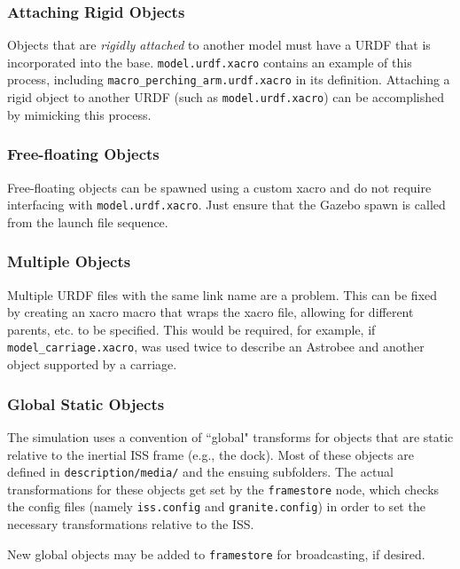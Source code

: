 \documentclass{article}
\begin{document}
\subsubsection{Attaching Rigid Objects}

Objects that are \textit{rigidly attached} to another model must have a URDF that is incorporated into the base. \texttt{model.urdf.xacro} contains an example of this process, including \texttt{macro\_perching\_arm.urdf.xacro} in its definition. Attaching a rigid object to another URDF (such as \texttt{model.urdf.xacro}) can be accomplished by mimicking this process.

\subsubsection{Free-floating Objects}

Free-floating objects can be spawned using a custom xacro and do not require interfacing with \texttt{model.urdf.xacro}. Just ensure that the Gazebo spawn is called from the launch file sequence.

\subsubsection{Multiple Objects}

Multiple URDF files with the same link name are a problem. This can be fixed by creating an xacro macro that wraps the xacro file, allowing for different parents, etc. to be specified. This would be required, for example, if \texttt{model\_carriage.xacro}, was used twice to describe an Astrobee and another object supported by a carriage.

\subsubsection{Global Static Objects}

The simulation uses a convention of ``global" transforms for objects that are static relative to the inertial ISS frame (e.g., the dock). Most of these objects are defined in \texttt{description/media/} and the ensuing subfolders. The actual transformations for these objects get set by the \texttt{framestore} node, which checks the config files (namely \texttt{iss.config} and \texttt{granite.config}) in order to set the necessary transformations relative to the ISS.

New global objects may be added to \texttt{framestore} for broadcasting, if desired.
\end{document}
